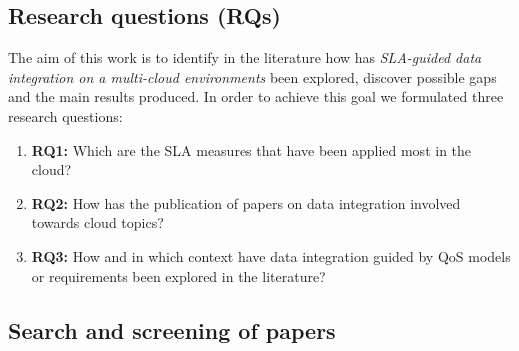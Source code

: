  
  
\subsection{Research questions (RQs)}
The aim of this work is to identify in the literature how has \textit{SLA-guided
data integration on a multi-cloud environments} been explored, discover possible
gaps and the main results produced.    
In order to achieve this goal we formulated three research questions:
\begin{enumerate}
\item \textbf{RQ1:} Which are the SLA measures that have been applied most in
the cloud?
\item \textbf{RQ2:}  How has the publication of papers on data integration
involved towards cloud topics?
\item \textbf{RQ3:} How and in which context have data integration guided by QoS
models or requirements been explored in the literature?
\end{enumerate}

\subsection{Search and screening of papers} \label{subsec:search}

